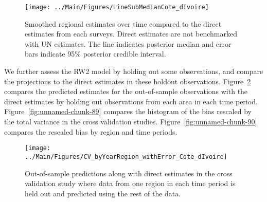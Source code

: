 \documentclass[12pt]{article}\usepackage[]{graphicx}\usepackage[]{color}
\newenvironment{knitrout}{}{} %
\begin{document}
\begin{knitrout}
\color{fgcolor}\begin{figure}[bht]

{\centering \texttt{[image: ../Main/Figures/LineSubMedianCote\_dIvoire]} 

}

\caption[Smoothed regional estimates over time compared to the direct estimates from each surveys]{Smoothed regional estimates over time compared to the direct estimates from each surveys. Direct estimates are not benchmarked with UN estimates. The line indicates posterior median and error bars indicate 95\% posterior credible interval.}\label{fig:unnamed-chunk-87}
\end{figure}


\end{knitrout}
We further assess the RW2 model by holding out some observations, and compare the projections to the direct estimates in these holdout observations. Figure~\ref{fig:unnamed-chunk-88} compares the predicted estimates for the out-of-sample observations  with the direct estimates by holding out observations from each area in each time period.  Figure~\ref{fig:unnamed-chunk-89} compares the histogram of the bias rescaled by the total variance in the cross validation studies. Figure~\ref{fig:unnamed-chunk-90} compares the rescaled bias by region and time periods.



 
\begin{knitrout}
\color{fgcolor}\begin{figure}[bht]

{\centering \texttt{[image: ../Main/Figures/CV\_byYearRegion\_withError\_Cote\_dIvoire]} 

}

\caption[Out-of-sample predictions along with direct estimates in the cross validation study where data from one region in each time period is held out and predicted using the rest of the data]{Out-of-sample predictions along with direct estimates in the cross validation study where data from one region in each time period is held out and predicted using the rest of the data.}\label{fig:unnamed-chunk-88}
\end{figure}


\end{knitrout}
\end{document}
